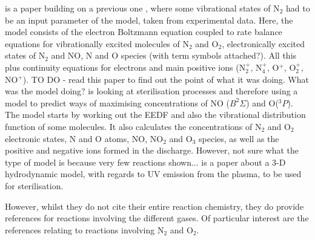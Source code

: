 \documentclass[11pt, oneside]{article}   	%
\begin{document}
is a paper building on a previous one \cite{Guerra1995non}, where some vibrational states of N$_2$ had to be an input parameter of the model, taken from experimental data. Here, the model consists of the electron Boltzmann equation coupled to rate balance equations for vibrationally excited molecules of N$_2$ and O$_2$, electronically excited states of N$_2$ and NO, N and O species (with term symbols attached?). All this plus continuity equations for electrons and main positive ions (N$_2^+$, N$_4^+$, O$^+$, O$_2^+$, NO$^+$). TO DO - read this paper to find out the point of what it was doing. What was the model doing? 
\cite{Pintassilgo2005modelling} is looking at sterilisation processes and therefore using a model to predict ways of maximising concentrations of NO ($B ^2\Sigma$) and O($^3P$). 
The model starts by working out the EEDF and also the vibrational distribution function of some molecules. 
It also calculates the concentrations of N$_2$ and O$_2$ electronic states, N and O atoms, NO, NO$_2$ and O$_3$ species, as well as the positive and negative ions formed in the discharge. However, not sure what the type of model is because very few reactions shown...
\cite{Kutasi2008modelling} is a paper about a 3-D hydrodynamic model, with regards to UV emission from the plasma, to be used for sterilisation.

However, whilst they do not cite their entire reaction chemistry, they do provide references for reactions involving the different gases. Of particular interest are the references relating to reactions involving N$_2$ and O$_2$.
\end{document}
